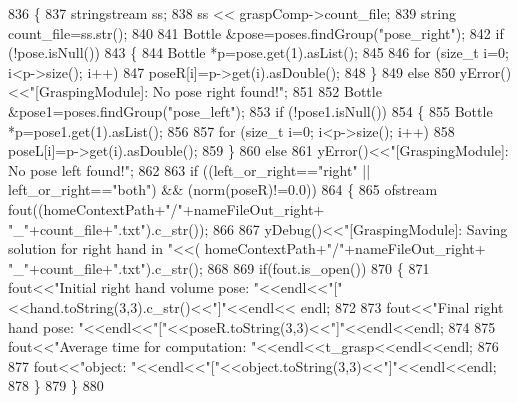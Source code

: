 \begin{DoxyCode}
836 \{
837     stringstream ss;
838     ss << graspComp->count\_file;
839     \textcolor{keywordtype}{string} count\_file=ss.str();
840 
841     Bottle &pose=poses.findGroup(\textcolor{stringliteral}{"pose\_right"});
842     \textcolor{keywordflow}{if} (!pose.isNull())
843     \{
844         Bottle *p=pose.get(1).asList();
845 
846         \textcolor{keywordflow}{for} (\textcolor{keywordtype}{size\_t} i=0; i<p->size(); i++)
847             poseR[i]=p->get(i).asDouble();
848     \}
849     \textcolor{keywordflow}{else}
850         yError()<<\textcolor{stringliteral}{"[GraspingModule]: No pose right found!"};
851 
852     Bottle &pose1=poses.findGroup(\textcolor{stringliteral}{"pose\_left"});
853     \textcolor{keywordflow}{if} (!pose1.isNull())
854     \{
855         Bottle *p=pose1.get(1).asList();
856 
857         \textcolor{keywordflow}{for} (\textcolor{keywordtype}{size\_t} i=0; i<p->size(); i++)
858             poseL[i]=p->get(i).asDouble();
859     \}
860     \textcolor{keywordflow}{else}
861         yError()<<\textcolor{stringliteral}{"[GraspingModule]: No pose left found!"};
862 
863     \textcolor{keywordflow}{if} ((left_or_right==\textcolor{stringliteral}{"right"} || left_or_right==\textcolor{stringliteral}{"both"}) && (norm(poseR)!=0.0))
864     \{
865         ofstream fout((homeContextPath+\textcolor{stringliteral}{"/"}+nameFileOut_right+ \textcolor{stringliteral}{"\_"}+count\_file+\textcolor{stringliteral}{".txt"}).c\_str());
866 
867         yDebug()<<\textcolor{stringliteral}{"[GraspingModule]: Saving solution for right hand in "}<<(
      homeContextPath+\textcolor{stringliteral}{"/"}+nameFileOut_right+ \textcolor{stringliteral}{"\_"}+count\_file+\textcolor{stringliteral}{".txt"}).c\_str();
868 
869         \textcolor{keywordflow}{if}(fout.is\_open())
870         \{
871             fout<<\textcolor{stringliteral}{"Initial right hand volume pose: "}<<endl<<\textcolor{stringliteral}{"["}<<hand.toString(3,3).c\_str()<<\textcolor{stringliteral}{"]"}<<endl<<
      endl;
872 
873             fout<<\textcolor{stringliteral}{"Final right hand pose: "}<<endl<<\textcolor{stringliteral}{"["}<<poseR.toString(3,3)<<\textcolor{stringliteral}{"]"}<<endl<<endl;
874 
875             fout<<\textcolor{stringliteral}{"Average time for computation: "}<<endl<<t\_grasp<<endl<<endl;
876 
877             fout<<\textcolor{stringliteral}{"object: "}<<endl<<\textcolor{stringliteral}{"["}<<\textcolor{keywordtype}{object}.toString(3,3)<<\textcolor{stringliteral}{"]"}<<endl<<endl;
878         \}  
879     \}
880 

\end{DoxyCode}
